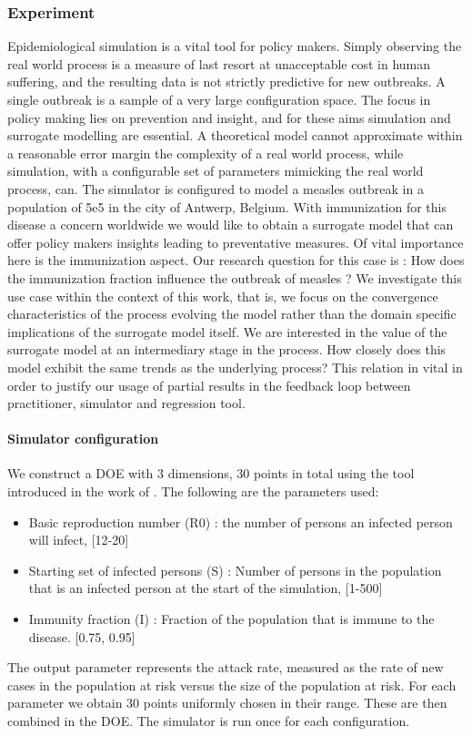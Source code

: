 \subsubsection{Experiment}
Epidemiological simulation is a vital tool for policy makers. Simply observing the real world process is a measure of last resort at unacceptable cost in human suffering, and the resulting data is not strictly predictive for new outbreaks. A single outbreak is a sample of a very large configuration space. The focus in policy making lies on prevention and insight, and for these aims simulation and surrogate modelling are essential. A theoretical model cannot approximate within a reasonable error margin the complexity of a real world process, while simulation, with a configurable set of parameters mimicking the real world process, can.
The simulator is configured to model a measles outbreak in a population of 5e5 in the city of Antwerp, Belgium. With immunization for this disease a concern worldwide we would like to obtain a surrogate model that can offer policy makers insights leading to preventative measures. Of vital importance here is the immunization aspect. Our research question for this case is : How does the immunization fraction influence the outbreak of measles ?
We investigate this use case within the context of this work, that is, we focus on the convergence characteristics of the process evolving the model rather than the domain specific implications of the surrogate model itself. We are interested in the value of the surrogate model at an intermediary stage in the process. How closely does this model exhibit the same trends as the underlying process? This relation in vital in order to justify our usage of partial results in the feedback loop between practitioner, simulator and regression tool.
\paragraph{Simulator configuration}
We construct a DOE with 3 dimensions, 30 points in total using the tool introduced in the work of \citep{DOE}. 
The following are the parameters used:
\begin{itemize}
\item Basic reproduction number (R0) : the number of persons an infected person will infect, [12-20]
\item Starting set of infected persons (S) : Number of persons in the population that is an infected person at the start of the simulation, [1-500]
\item Immunity fraction (I) : Fraction of the population that is immune to the disease. [0.75, 0.95]
\end{itemize}
The output parameter represents the attack rate, measured as the rate of new cases in the population at risk versus the size of the population at risk.
For each parameter we obtain 30 points uniformly chosen in their range. These are then combined in the DOE.
The simulator is run once for each configuration. 
